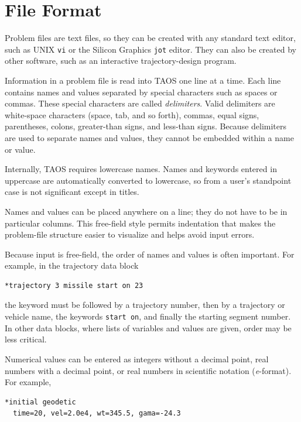 \section{File Format}\label{sec:problem-file-format}

Problem files are text files, so they can be created with any standard text editor,
such as UNIX \texttt{vi} or the Silicon Graphics \texttt{jot} editor. They can also
be created by other software, such as an interactive trajectory-design program.

Information in a problem file is read into TAOS one line at a time. Each line
contains names and values separated by special characters such as spaces or commas.
These special characters are called \emph{delimiters}. Valid delimiters are
white-space characters (space, tab, and so forth), commas, equal signs,
parentheses, colons, greater-than signs, and less-than signs. Because delimiters are
used to separate names and values, they cannot be embedded within a name or value.

Internally, TAOS requires lowercase names. Names and keywords entered in uppercase
are automatically converted to lowercase, so from a user's standpoint case is not
significant except in titles.


Names and values can be placed anywhere on a line; they do not have to be in
particular columns. This free-field style permits indentation that makes the
problem-file structure easier to visualize and helps avoid input errors.

Because input is free-field, the order of names and values is often important. For
example, in the trajectory data block

\begin{lstlisting}[style=taosmanual]
*trajectory 3 missile start on 23
\end{lstlisting}

the keyword  must be followed by a trajectory number,
then by a trajectory or vehicle name, the keywords \texttt{start on}, and finally the
starting segment number. In other data blocks, where lists of variables and values
are given, order may be less critical.

Numerical values can be entered as integers without a decimal point, real numbers
with a decimal point, or real numbers in scientific notation (\emph{e}-format). For
example,

\begin{lstlisting}[style=taosmanual]
*initial geodetic
  time=20, vel=2.0e4, wt=345.5, gama=-24.3
\end{lstlisting}

